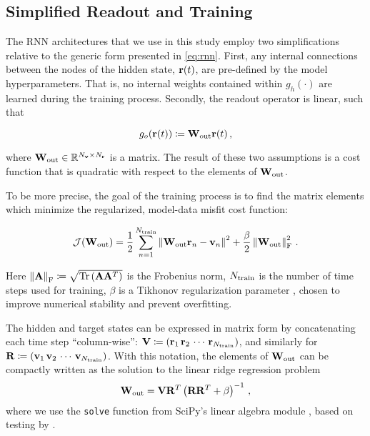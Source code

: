 \subsection{Simplified Readout and Training}
\label{subsec:readout}

The RNN architectures that we use in this study employ two
simplifications relative to the generic form presented in
\cref{eq:rnn}.
First, any internal connections between the nodes of the hidden state,
$\mathbf{r}(t)$, are pre-defined by the model hyperparameters.
That is, no internal weights contained within $g_h(\cdot)$
are learned during the training process.
Secondly, the readout operator is linear, such that
\begin{linenomath}\begin{equation*}
    g_o(\mathbf{r}(t)) \coloneqq \mathbf{W}_\text{out} \mathbf{r}(t) \, ,
\end{equation*}\end{linenomath}
where $\mathbf{W}_\text{out} \in \mathbb{R}^{N_{\mathbf{v}}\times N_{\mathbf{r}}}$ is a matrix.
The result of these two assumptions is a cost function that is quadratic with
respect to the elements of $\mathbf{W}_\text{out}$.

To be more precise, the goal of the training process is to find the matrix
elements which minimize the regularized, model-data misfit cost function:
\begin{linenomath}\begin{equation}
    \mathcal{J}(\mathbf{W}_\text{out}) =
        \dfrac{1}{2}\sum_{n=1}^{N_\text{train}} \left\lVert\mathbf{W}_\text{out} \mathbf{r}_n - \mathbf{v}_n\right\rVert^2
        +
        \dfrac{\beta}{2}\left\lVert\mathbf{W}_\text{out}\right\rVert_\text{F}^2 \, .
    \label{eq:cost}
\end{equation}\end{linenomath}
Here
$\left\lVert\mathbf{A}\right\rVert_\text{F} \coloneqq
\sqrt{\text{Tr}\left(\mathbf{A}\mathbf{A}^T\right)}$
is the Frobenius norm,
$N_\text{train}$ is the number of time steps used for training,
$\beta$ is a Tikhonov regularization parameter \citep{tikhonov_solution_1963}, chosen to improve
numerical stability and prevent overfitting.

The hidden and target states can be expressed in matrix form by concatenating
each time step ``column-wise'':
$\mathbf{V} \coloneqq (\mathbf{r}_1 \, \mathbf{r}_2 \, \cdots \, \mathbf{r}_{N_\text{train}})$,
and similarly for
$\mathbf{R} \coloneqq (\mathbf{v}_1 \, \mathbf{v}_2 \, \cdots \, \mathbf{v}_{N_\text{train}})$.
With this notation, the elements of $\mathbf{W}_\text{out}$ can be compactly written as the
solution to the linear ridge regression problem
\begin{equation}
    \mathbf{W}_\text{out} = \mathbf{V} \mathbf{R}^T \left(\mathbf{R}\mathbf{R}^T + \beta\right)^{-1} \, ,
    \label{eq:ridge_regression}
\end{equation}
where we use the \texttt{solve} function from SciPy's linear algebra module
\citep{scipy_2020}, based on testing by \citet{platt_systematic_2022}.


